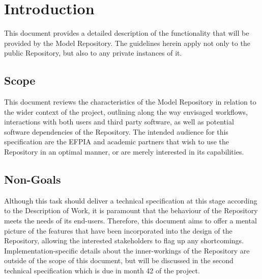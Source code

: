 \section{Introduction}
\label{introduction}
This document provides a detailed description of the functionality that will be provided by the \ddmore Model Repository. The guidelines herein apply not only to the public Repository, but also to any private instances of it.

\subsection{Scope}
This document reviews the characteristics of the \ddmore Model Repository in relation to the wider context of the project, outlining along the way envisaged workflows, interactions with both users and third party software, as well as potential software dependencies of the Repository. The intended audience for this specification are the EFPIA and academic partners that wish to use the Repository in an optimal manner, or are merely interested in its capabilities.

\subsection{Non-Goals}
Although this task should deliver a technical specification at this stage according to the Description of Work, it is paramount that the behaviour of the Repository meets the needs of its end-users. Therefore, this document aims to offer a mental picture of the features that have been incorporated into the design of the Repository, allowing the interested stakeholders to flag up any shortcomings. Implementation-specific details about the inner-workings of the Repository are outside of the scope of this document, but will be discussed in the second technical specification which is due in month 42 of the project. 

